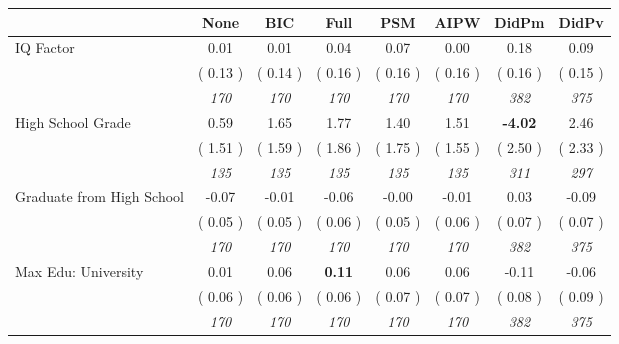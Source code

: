 \begin{tabular}{l c c c c c c c}
\toprule
 & None & BIC & Full & PSM & AIPW & DidPm & DidPv \\
\midrule
IQ Factor &      0.01 &      0.01 &      0.04 &      0.07 &      0.00 &      0.18 &      0.09 \\
& (     0.13 ) & (     0.14 ) & (     0.16 ) & (     0.16 ) & (     0.16 ) & (     0.16 ) & (     0.15 ) \\
& \textit{ 170 } & \textit{ 170 } & \textit{ 170 } & \textit{ 170 } & \textit{ 170 } & \textit{ 382 } & \textit{ 375 } \\
High School Grade &      0.59 &      1.65 &      1.77 &      1.40 &      1.51 & \textbf{     -4.02 } &      2.46 \\
& (     1.51 ) & (     1.59 ) & (     1.86 ) & (     1.75 ) & (     1.55 ) & (     2.50 ) & (     2.33 ) \\
& \textit{ 135 } & \textit{ 135 } & \textit{ 135 } & \textit{ 135 } & \textit{ 135 } & \textit{ 311 } & \textit{ 297 } \\
Graduate from High School &     -0.07 &     -0.01 &     -0.06 &     -0.00 &     -0.01 &      0.03 &     -0.09 \\
& (     0.05 ) & (     0.05 ) & (     0.06 ) & (     0.05 ) & (     0.06 ) & (     0.07 ) & (     0.07 ) \\
& \textit{ 170 } & \textit{ 170 } & \textit{ 170 } & \textit{ 170 } & \textit{ 170 } & \textit{ 382 } & \textit{ 375 } \\
Max Edu: University &      0.01 &      0.06 & \textbf{      0.11 } &      0.06 &      0.06 &     -0.11 &     -0.06 \\
& (     0.06 ) & (     0.06 ) & (     0.06 ) & (     0.07 ) & (     0.07 ) & (     0.08 ) & (     0.09 ) \\
& \textit{ 170 } & \textit{ 170 } & \textit{ 170 } & \textit{ 170 } & \textit{ 170 } & \textit{ 382 } & \textit{ 375 } \\
\bottomrule
\end{tabular}
